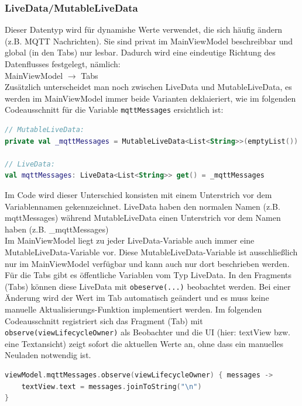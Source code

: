 \subsubsection{LiveData/MutableLiveData}
Dieser Datentyp wird für dynamishe Werte verwendet, die sich häufig ändern (z.B. MQTT Nachrichten). Sie sind privat im MainViewModel beschreibbar und global (in den Tabs) nur lesbar. Dadurch wird eine eindeutige Richtung des Datenflusses festgelegt, nämlich: \\MainViewModel $\rightarrow$ Tabs
\\Zusätzlich unterscheidet man noch zwischen LiveData und MutableLiveData, es werden im MainViewModel immer beide Varianten deklaieriert, wie im folgenden Codeausschnitt für die Variable \verb|mqttMessages| ersichtlich ist:
\begin{lstlisting}[language=Kotlin]
// MutableLiveData:
private val _mqttMessages = MutableLiveData<List<String>>(emptyList())

// LiveData:
val mqttMessages: LiveData<List<String>> get() = _mqttMessages       
\end{lstlisting}
Im Code wird dieser Unterschied konsisten mit einem Unterstrich vor dem Variablennamen gekennzeichnet. LiveData haben den normalen Namen (z.B. mqttMessages) während MutableLiveData einen Unterstrich vor dem Namen haben (z.B. \_mqttMessages)
\\
Im MainViewModel liegt zu jeder LiveData-Variable auch immer eine MutableLiveData-Variable vor. Diese MutableLiveData-Variable ist ausschließlich nur im MainViewModel verfügbar und kann auch nur dort beschrieben werden. Für die Tabs gibt es öffentliche Variablen vom Typ LiveData. In den Fragments (Tabs) können diese LiveData mit \verb|obeserve(...)| beobachtet werden. Bei einer Änderung wird der Wert im Tab automatisch geändert und es muss keine manuelle Aktualisierungs-Funktion implementiert werden.
Im folgenden Codeausschnitt registriert sich das Fragment (Tab) mit \texttt{observe(viewLifecycleOwner)} als Beobachter und die UI (hier: textView bzw. eine Textansicht) zeigt sofort die aktuellen Werte an, ohne dass ein manuelles Neuladen notwendig ist.
\begin{lstlisting}[language=Kotlin]
viewModel.mqttMessages.observe(viewLifecycleOwner) { messages ->
    textView.text = messages.joinToString("\n")
}
\end{lstlisting}

